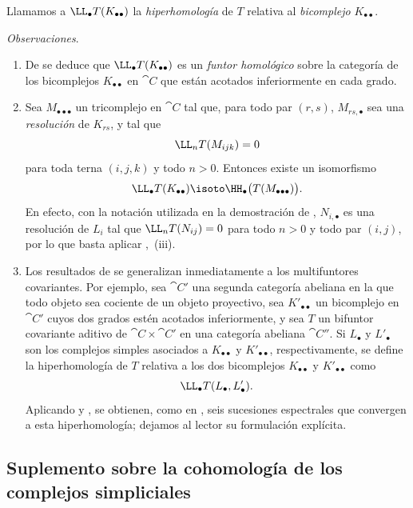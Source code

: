 \documentclass[oneside]{amsart}
\newcommand{\oldpage}[2][]{{\marginnote{\normalfont\textbf{#1}~|~#2}}\ignorespaces}
\let\EGAOriginalLabel\label
\renewcommand{\label}[1]{\phantomsection\EGAOriginalLabel{#1}}
\begin{document}
Llamamos a $\LL_\bullet T(K_{\bullet\bullet})$ la \emph{hiperhomología} de
$T$ relativa al \emph{bicomplejo} $K_{\bullet\bullet}$.

\begin{env}[11.7.3]
\label{0.11.7.3}
\emph{Observaciones}.
\begin{enumerate}
  \item[{\rm(i)}]
  De  se deduce que
  $\LL_\bullet T(K_{\bullet\bullet})$ es un \emph{funtor homológico} sobre la
  categoría de los bicomplejos $K_{\bullet\bullet}$ en $\cat{C}$ que están
  acotados inferiormente en cada grado.

\oldpage[0\textsubscript{III}]{43}
  \item[{\rm(ii)}]
  Sea $M_{\bullet\bullet\bullet}$ un tricomplejo en $\cat{C}$ tal que,
  para todo par $(r,s)$, $M_{rs,\bullet}$ sea una \emph{resolución} de $K_{rs}$,
  y tal que
  \[
    \LL_nT(M_{ijk})=0
  \]
  para toda terna $(i,j,k)$ y todo $n>0$.
  Entonces existe un isomorfismo
  \[
    \LL_\bullet T(K_{\bullet\bullet})
    \isoto
    \HH_\bullet\bigl(T(M_{\bullet\bullet\bullet})\bigr).
  \]
  En efecto, con la notación utilizada en la demostración de ,
  $N_{i,\bullet}$ es una resolución de $L_i$ tal que
  $\LL_nT(N_{ij})=0$ para todo $n>0$ y todo par $(i,j)$, por lo que
  basta aplicar ,~(iii).

  \item[{\rm(iii)}]
  Los resultados de  se generalizan inmediatamente a los
  multifuntores covariantes.
  Por ejemplo, sea $\cat{C}'$ una segunda categoría abeliana en la que todo
  objeto sea cociente de un objeto proyectivo, sea
  $K'_{\bullet\bullet}$ un bicomplejo en $\cat{C}'$ cuyos dos grados estén
  acotados inferiormente, y sea $T$ un bifuntor covariante aditivo de
  $\cat{C}\times\cat{C}'$ en una categoría abeliana $\cat{C}''$.
  Si $L_\bullet$ y $L'_\bullet$ son los complejos simples asociados a
  $K_{\bullet\bullet}$ y $K'_{\bullet\bullet}$, respectivamente, se define
  la hiperhomología de $T$ relativa a los dos bicomplejos
  $K_{\bullet\bullet}$ y $K'_{\bullet\bullet}$ como
  \[
    \LL_\bullet T(L_\bullet,L'_\bullet).
  \]
  Aplicando  y , se obtienen, como en
  , seis sucesiones espectrales que convergen a esta hiperhomología;
  dejamos al lector su formulación explícita.
\end{enumerate}
\end{env}

\subsection{Suplemento sobre la cohomología de los complejos simpliciales}
\label{subsection:0.11.8}
\end{document}

